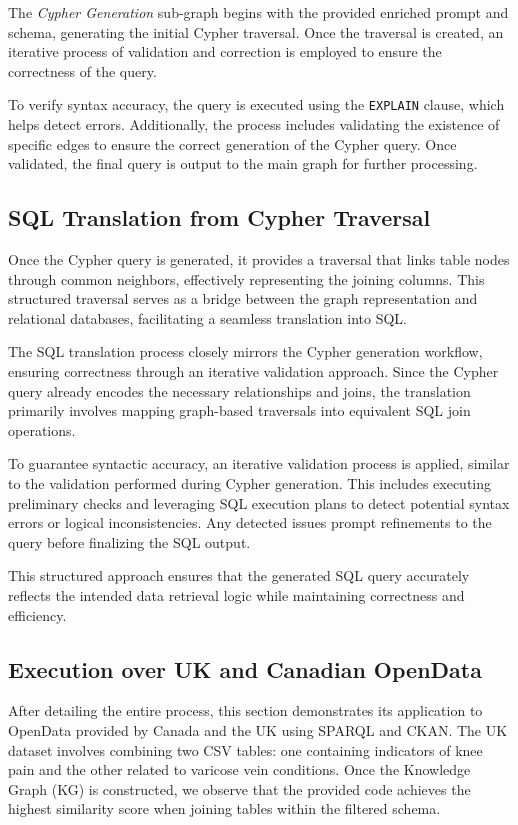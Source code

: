 The \textit{Cypher Generation} sub-graph begins with the provided enriched prompt and schema, generating the initial Cypher traversal. Once the traversal is created, an iterative process of validation and correction is employed to ensure the correctness of the query. 

To verify syntax accuracy, the query is executed using the \texttt{EXPLAIN} clause, which helps detect errors. Additionally, the process includes validating the existence of specific edges to ensure the correct generation of the Cypher query. Once validated, the final query is output to the main graph for further processing.


\subsection{SQL Translation from Cypher Traversal}

Once the Cypher query is generated, it provides a traversal that links table nodes through common neighbors, effectively representing the joining columns. This structured traversal serves as a bridge between the graph representation and relational databases, facilitating a seamless translation into SQL.

The SQL translation process closely mirrors the Cypher generation workflow, ensuring correctness through an iterative validation approach. Since the Cypher query already encodes the necessary relationships and joins, the translation primarily involves mapping graph-based traversals into equivalent SQL join operations. 

To guarantee syntactic accuracy, an iterative validation process is applied, similar to the validation performed during Cypher generation. This includes executing preliminary checks and leveraging SQL execution plans to detect potential syntax errors or logical inconsistencies. Any detected issues prompt refinements to the query before finalizing the SQL output. 

This structured approach ensures that the generated SQL query accurately reflects the intended data retrieval logic while maintaining correctness and efficiency.


\subsection{Execution over UK and Canadian OpenData}

After detailing the entire process, this section demonstrates its application to OpenData provided by Canada and the UK using SPARQL and CKAN. The UK dataset involves combining two CSV tables: one containing indicators of knee pain and the other related to varicose vein conditions. Once the Knowledge Graph (KG) is constructed, we observe that the provided code achieves the highest similarity score when joining tables within the filtered schema.

